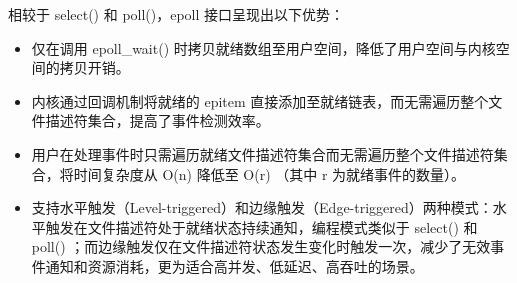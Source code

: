 {\begin{enumerate}[label=\arabic*.]
    相较于 select() 和 poll()，epoll 接口呈现出以下优势：
    \begin{itemize}
        \item 仅在调用 epoll\_wait() 时拷贝就绪数组至用户空间，降低了用户空间与内核空间的拷贝开销。
        \item 内核通过回调机制将就绪的 epitem 直接添加至就绪链表，而无需遍历整个文件描述符集合，提高了事件检测效率。
        \item 用户在处理事件时只需遍历就绪文件描述符集合而无需遍历整个文件描述符集合，将时间复杂度从 O(n) 降低至 O(r) （其中 r 为就绪事件的数量）。
        \item 支持水平触发（Level-triggered）和边缘触发（Edge-triggered）两种模式：水平触发在文件描述符处于就绪状态持续通知，编程模式类似于 select() 和 poll() ；而边缘触发仅在文件描述符状态发生变化时触发一次，减少了无效事件通知和资源消耗，更为适合高并发、低延迟、高吞吐的场景。
    \end{itemize}
    

\end{enumerate}}
